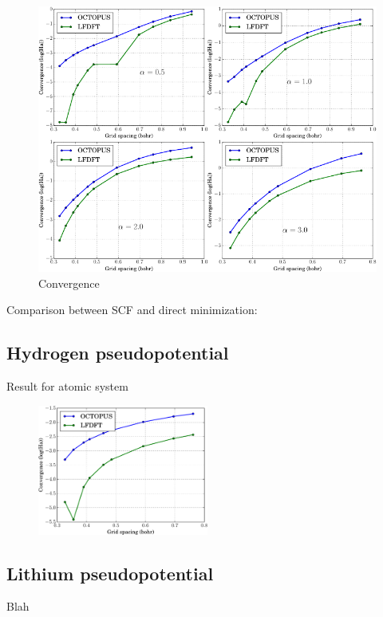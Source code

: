 \begin{figure}[h]
\centering
\includegraphics[scale=1.0]{images/COMBINE_v1.pdf}
\caption{Convergence}
\end{figure}

Comparison between SCF and direct minimization:

\subsection{Hydrogen pseudopotential}

Result for atomic system

\begin{figure}
\includegraphics[width=0.5\textwidth]{images/CONV_atom_H.pdf}
\end{figure}

\subsection{Lithium pseudopotential}
Blah

